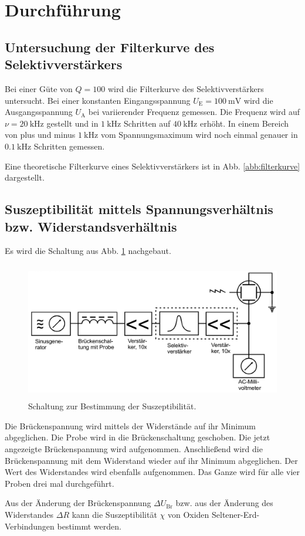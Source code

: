 \section{Durchführung}
\label{sec:Durchführung}

\subsection{Untersuchung der Filterkurve des Selektivverstärkers}
Bei einer Güte von $Q = \num{100}$ wird die Filterkurve des Selektivverstärkers
untersucht. Bei einer konstanten Eingangsspannung $U_\text{E} = \SI{100}{\milli\volt}$
wird die Ausgangsspannung $U_\text{A}$ bei variierender Frequenz gemessen.
Die Frequenz wird auf $\nu = \SI{20}{\kilo\hertz}$ gestellt und in $\SI{1}{\kilo\hertz}$
Schritten auf $\SI{40}{\kilo\hertz}$ erhöht. In einem Bereich von plus und minus 
$\SI{1}{\kilo\hertz}$ vom Spannungsmaximum wird noch einmal genauer in $\SI{0.1}{\kilo\hertz}$
Schritten gemessen.

\noindent Eine theoretische Filterkurve eines Selektivverstärkers ist in Abb. 
\ref{abb:filterkurve} dargestellt.


\subsection{Suszeptibilität mittels Spannungsverhältnis bzw. Widerstandsverhältnis}
Es wird die Schaltung aus Abb. \ref{abb:schaltbild} nachgebaut.

\begin{figure}
    \centering
    \includegraphics[width=12cm, height=6cm]{build/schaltbild.png}
    \caption{Schaltung zur Bestimmung der Suszeptibilität. \cite{V606}}
    \label{abb:schaltbild}
\end{figure}

\noindent Die Brückenspannung wird mittels der Widerstände auf ihr Minimum abgeglichen.
Die Probe wird in die Brückenschaltung geschoben. Die jetzt angezeigte Brückenspannung
wird aufgenommen. Anschließend wird die Brückenspannung mit dem Widerstand wieder auf
ihr Minimum abgeglichen. Der Wert des Widerstandes wird ebenfalls aufgenommen.
Das Ganze wird für alle vier Proben drei mal durchgeführt.

\noindent Aus der Änderung der Brückenspannung $\Delta U_\text{Br}$ bzw. aus der 
Änderung des Widerstandes $\Delta R$ kann die Suszeptibilität $\chi$ von Oxiden 
Seltener-Erd-Verbindungen bestimmt werden.
